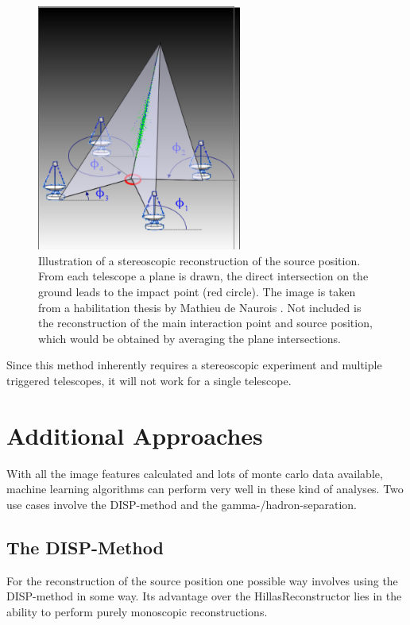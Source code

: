 \begin{figure}
	\centering
	\includegraphics[width=0.6\textwidth]{images/hillas_reco.png}
	\caption{Illustration of a stereoscopic reconstruction of the source position.
    From each telescope a plane is drawn, the direct intersection 
    on the ground leads to the impact point (red circle).
    The image is taken from a habilitation thesis by 
    Mathieu de Naurois \cite{hillas_reco}.
    Not included is the reconstruction of the main interaction point
    and source position, which would be obtained by averaging the plane
    intersections.}
	\label{fig:hillas_reconstructor}
\end{figure}

Since this method inherently requires a stereoscopic experiment
and multiple triggered telescopes, it will not work for a single telescope.




\section{Additional Approaches}
With all the image features calculated and lots of monte carlo
data available, machine learning algorithms can perform
very well in these kind of analyses.
Two use cases involve the DISP-method
and the gamma-/hadron-separation.

\subsection{The DISP-Method}
For the reconstruction of the source position
one possible way involves using the DISP-method in some way.
Its advantage over the HillasReconstructor lies in the ability to
perform purely monoscopic reconstructions.

